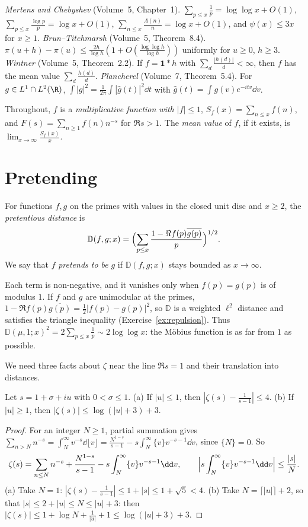 \begin{reminder}
\emph{Mertens and Chebyshev} (Volume~5, Chapter~1). $\sum_{p\le x}\frac1p=\log\log x+O(1)$, $\sum_{p\le x}\frac{\log p}p=\log x+O(1)$, $\sum_{n\le x}\frac{\Lambda(n)}n=\log x+O(1)$, and $\psi(x)\le3x$ for $x\ge1$.
\emph{Brun--Titchmarsh} (Volume~5, Theorem~8.4). $\pi(u+h)-\pi(u)\le\frac{2h}{\log h}(1+O(\frac{\log\log h}{\log h}))$ uniformly for $u\ge0$, $h\ge3$.
\emph{Wintner} (Volume~5, Theorem~2.2). If $f=\mathbf1*h$ with $\sum_d\frac{|h(d)|}d<\infty$, then $f$ has the mean value $\sum_d\frac{h(d)}d$.
\emph{Plancherel} (Volume~7, Theorem~5.4). For $g\in L^1\cap L^2(\R)$, $\int|g|^2=\frac1{2\pi}\int|\hat g(t)|^2\dd t$ with $\hat g(t)=\int g(v)e^{-itv}\dd v$.
\end{reminder}

Throughout, $f$ is a \emph{multiplicative function with $|f|\le1$}, $S_f(x)=\sum_{n\le x}f(n)$, and $F(s)=\sum_{n\ge1}f(n)n^{-s}$ for $\Re s>1$. The \emph{mean value} of $f$, if it exists, is $\lim_{x\to\infty}\frac{S_f(x)}x$.

\section{Pretending}

\begin{definition}\label{def:pretend}
For functions $f,g$ on the primes with values in the closed unit disc and $x\ge2$, the \emph{pretentious distance} is
\[
\mathbb D(f,g;x)=\Bigl(\sum_{p\le x}\frac{1-\Re f(p)\overline{g(p)}}p\Bigr)^{1/2}.
\]
We say that $f$ \emph{pretends to be} $g$ if $\mathbb D(f,g;x)$ stays bounded as $x\to\infty$.
\end{definition}

Each term is non-negative, and it vanishes only when $f(p)=g(p)$ is of modulus $1$. If $f$ and $g$ are unimodular at the primes, $1-\Re f(p)\overline{g(p)}=\frac12|f(p)-g(p)|^2$, so $\mathbb D$ is a weighted $\ell^2$ distance and satisfies the triangle inequality (Exercise~\ref{ex:repulsion}). Thus $\mathbb D(\mu,1;x)^2=2\sum_{p\le x}\frac1p\sim2\log\log x$: the Möbius function is as far from $1$ as possible.

We need three facts about $\zeta$ near the line $\Re s=1$ and their translation into distances.

\begin{lemma}\label{lem:zetanear}
Let $s=1+\sigma+iu$ with $0<\sigma\le1$. (a) If $|u|\le1$, then $|\zeta(s)-\frac1{s-1}|\le4$. (b) If $|u|\ge1$, then $|\zeta(s)|\le\log(|u|+3)+3$.
\end{lemma}
\begin{proof}
For an integer $N\ge1$, partial summation gives $\sum_{n>N}n^{-s}=\int_N^\infty v^{-s}\dd\lfloor v\rfloor=\frac{N^{1-s}}{s-1}-s\int_N^\infty\{v\}v^{-s-1}\dd v$, since $\{N\}=0$. So
\[
\zeta(s)=\sum_{n\le N}n^{-s}+\frac{N^{1-s}}{s-1}-s\int_N^\infty\{v\}v^{-s-1}\dd v,\qquad\Bigl|s\int_N^\infty\{v\}v^{-s-1}\dd v\Bigr|\le\frac{|s|}N.
\]
(a) Take $N=1$: $|\zeta(s)-\frac1{s-1}|\le1+|s|\le1+\sqrt5<4$. (b) Take $N=\lceil|u|\rceil+2$, so that $|s|\le2+|u|\le N\le|u|+3$: then $|\zeta(s)|\le1+\log N+\frac1{|u|}+1\le\log(|u|+3)+3$.
\end{proof}


